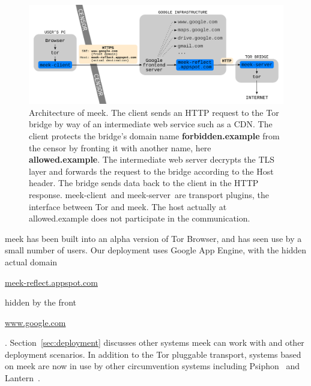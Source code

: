 \documentclass[conference]{IEEEtran}
\def\meekclient{\mbox{meek-client}}
\def\meekserver{\mbox{meek-server}}
\def\urll#1{\begin{NoHyper}\url{#1}\end{NoHyper}}
\begin{document}
\begin{figure}
\centering
\includegraphics[width=\linewidth]{architecture}
\caption{
Architecture of meek.
The client sends an HTTP request to the Tor bridge by way of an intermediate web service such as a CDN.
The client protects the bridge's domain name \textbf{forbidden.example} from the censor
by fronting it with another name, here \textbf{allowed.example}.
The intermediate web server decrypts the TLS layer and forwards the request to the bridge
according to the Host header.
The bridge sends data back to the client in the HTTP response.
\meekclient\ and \meekserver\ are transport plugins, the interface between Tor and meek.
The host actually at allowed.example does not participate in the communication.
}
\label{fig:architecture}
\end{figure}

meek has been built into an alpha version of Tor Browser,
and has seen use by a small number of users.
Our deployment uses Google App Engine,
with the hidden actual domain \urll{meek-reflect.appspot.com}
hidden by the front \urll{www.google.com}.
Section~\ref{sec:deployment} discusses other systems meek can work with
and other deployment scenarios.
In addition to the Tor pluggable transport,
systems based on meek are now in use by other circumvention systems
including Psiphon~\cite{psiphon} and Lantern~\cite{lantern}.

\end{document}
